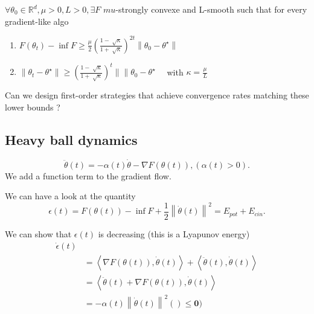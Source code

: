 \begin{thm}[Nesterov 2003]
    $ \forall \theta _0 \in \mathbb{R}^d, \mu > 0, L > 0, \exists F $ $ mu $-strongly convexe and L-smooth such that for every gradient-like algo \begin{enumerate}
        \item $ F(\theta _t) - \inf F \geq  \frac{\mu }{2} ( \frac{1 - \sqrt[]{\kappa }}{1 + \sqrt[]{\kappa }} )^{2t} \left\| \theta _0 - \theta ^\star  \right\|  $ 
        \item $\left\| \theta _t - \theta ^{\star } \right\| \geq (\frac{1 - \sqrt[]{\kappa }}{1 + \sqrt[]{\kappa }})^t \left\|  \right\| \theta _0 - \theta ^{\star } \quad $ with $\kappa = \frac{\mu }{L}$ 
    \end{enumerate}
\end{thm}

Can we design first-order strategies that achieve convergence rates matching these lower bounds ? 

\subsection{Heavy ball dynamics}

\[
    \ddot{\theta }(t) = - \alpha (t) \dot{\theta } - \nabla F(\theta (t)), (\alpha (t) > 0 )
.\]
We add a function term to the gradient flow. 

We can have a look at the quantity 
\[
    \epsilon (t) = F(\theta (t)) - \inf F + \frac{1}{2} \left\| \dot{\theta }(t) \right\| ^2 = E_{pot} + E_{cin}
.\]

We can show that $ \epsilon (t) $ is decreasing (this is a Lyapunov energy) 
\begin{align*}
    \dot{\epsilon }(t) \\
        &= \left\langle \nabla F(\theta (t)) , \dot{\theta }(t) \right\rangle + \left\langle \ddot{\theta }(t) , \dot{\theta }(t) \right\rangle \\
        &= \left\langle \ddot{\theta }(t) + \nabla F(\theta (t)), \dot{\theta }(t) \right\rangle \\
        &= - \alpha (t) \left\| \dot{\theta }(t) \right\| ^2 \mathbf{()\leq 0)}
\end{align*}

